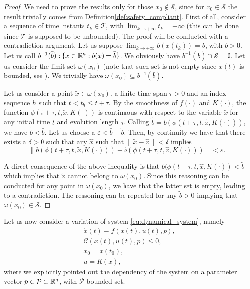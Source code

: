 \begin{proof}
	We need to prove the results only for those $x_0\notin \mathcal{S}$, since for $x_0\in\mathcal{S}$ the result trivially comes from Definition\tildeAdd\ref{def:safety_compliant}.
	First of all, consider a sequence of time instants $t_k\in \mathcal{T}$,  with $\lim_{k\rightarrow +\infty} t_k=+\infty$ (this can be done since $\mathcal{T}$ is supposed to be unbounded).
	The proof will be conducted with a contradiction argument.
	Let us suppose $\lim_{k \rightarrow +\infty} b(x(t_k))=\bar{b}$, with $\bar{b}>0$. Let us call $b^{-1}(	\bar{b}):\{x\in\Bbb{R}^n: b(x)=\bar{b}\}$. 
	We obviously have $b^{-1} (\bar{b})\cap \mathcal{S}=\emptyset$. Let us consider the limit set $\omega(x_0)$ (note that such set is not empty since $x(t)$ is bounded, see \cite{khalil}). We trivially have $\omega(x_0)\subseteq b^{-1} (\bar{b})$.
	
	Let us consider a point $\tilde{x}\in\omega(x_0)$, a finite time span $\tau >0$ and an index sequence $h$ such that $t<t_h\leq t+\tau$. By the smoothness of $f(\cdot)$ and $K(\cdot)$, the function $\phi(t+\tau, t, \tilde{x}, K(\cdot))$ is continuous with respect to the variable $\tilde{x}$ for any initial time $t$ {and evolution} length $\tau$.
	Calling $\tilde{b}=b(\phi(t+\tau, t, \tilde{x}, K(\cdot)))$, we have $\tilde{b}<\bar{b}$.
	Let us choose a $\varepsilon<\bar{b}-\tilde{b}$. Then, by continuity we have that there exists a $\delta >0$ such that any $\hat{x}$ such that $\|\tilde{x}-\hat{x}\|<\delta$ implies 
	\begin{equation*}
		\|b(\phi(t+\tau, t, \tilde{x}, K(\cdot)))-b(\phi(t+\tau, t, \hat{x}, K(\cdot)))\|<\varepsilon.
	\end{equation*}
	
	A direct consequence of the above inequality is that 
	$b(\phi(t+\tau, t, \hat{x}, K(\cdot))<\tilde{b}$ which implies that $\tilde{x}$ cannot belong to $\omega(x_0)$. Since this reasoning can be conducted for any point in $\omega(x_0)$, we have that the latter set is empty, leading to a contradiction. The reasoning can be repeated for any $\tilde{b}>0$ implying that $\omega(x_0)\in\mathcal{S}$.
	
\end{proof}








Let us now consider a variation of system \eqref{eq:dynamical_system}, namely 
\begin{subequations}\label{eq:dynamical_system_param}
	\begin{align}
		& \dot{x}(t) = f(x(t), u(t),p),\\
		& \mathcal{C}(x(t),u(t),p)\leq 0,\\
		& x_0=x(t_0), \\
		& u = K(x),
	\end{align}
\end{subequations}
where we explicitly pointed out the dependency of the system on a parameter vector $p\in \mathcal{P}\subset \Bbb{R}^q$, with $\mathcal{P}$ bounded set. 

